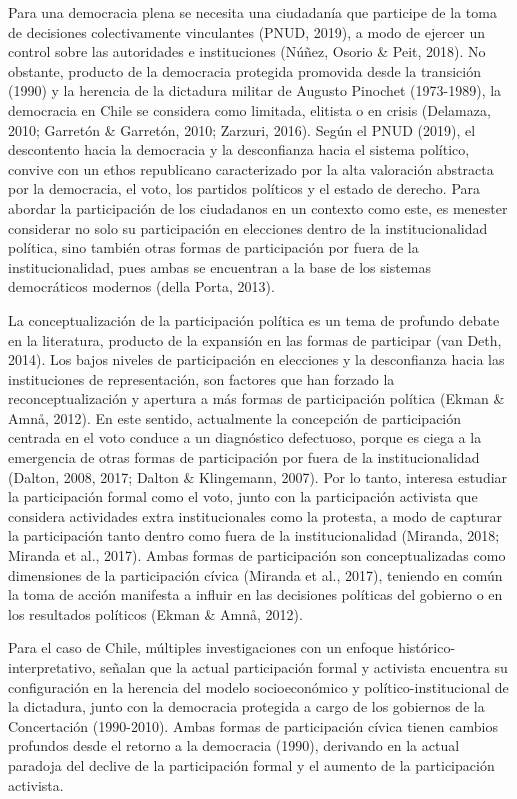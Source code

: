 \documentclass[12pt,twoside]{templates/facsothesis}
\begin{document}
Para una democracia plena se necesita una ciudadanía que participe de la toma de decisiones colectivamente vinculantes (PNUD, 2019), a modo de ejercer un control sobre las autoridades e instituciones (Núñez, Osorio \& Peit, 2018). No obstante, producto de la democracia protegida promovida desde la transición (1990) y la herencia de la dictadura militar de Augusto Pinochet (1973-1989), la democracia en Chile se considera como limitada, elitista o en crisis (Delamaza, 2010; Garretón \& Garretón, 2010; Zarzuri, 2016). Según el PNUD (2019), el descontento hacia la democracia y la desconfianza hacia el sistema político, convive con un ethos republicano caracterizado por la alta valoración abstracta por la democracia, el voto, los partidos políticos y el estado de derecho. Para abordar la participación de los ciudadanos en un contexto como este, es menester considerar no solo su participación en elecciones dentro de la institucionalidad política, sino también otras formas de participación por fuera de la institucionalidad, pues ambas se encuentran a la base de los sistemas democráticos modernos (della Porta, 2013).

La conceptualización de la participación política es un tema de profundo debate en la literatura, producto de la expansión en las formas de participar (van Deth, 2014). Los bajos niveles de participación en elecciones y la desconfianza hacia las instituciones de representación, son factores que han forzado la reconceptualización y apertura a más formas de participación política (Ekman \& Amnå, 2012). En este sentido, actualmente la concepción de participación centrada en el voto conduce a un diagnóstico defectuoso, porque es ciega a la emergencia de otras formas de participación por fuera de la institucionalidad (Dalton, 2008, 2017; Dalton \& Klingemann, 2007). Por lo tanto, interesa estudiar la participación formal como el voto, junto con la participación activista que considera actividades extra institucionales como la protesta, a modo de capturar la participación tanto dentro como fuera de la institucionalidad (Miranda, 2018; Miranda et al., 2017). Ambas formas de participación son conceptualizadas como dimensiones de la participación cívica (Miranda et al., 2017), teniendo en común la toma de acción manifesta a influir en las decisiones políticas del gobierno o en los resultados políticos (Ekman \& Amnå, 2012).

Para el caso de Chile, múltiples investigaciones con un enfoque histórico-interpretativo, señalan que la actual participación formal y activista encuentra su configuración en la herencia del modelo socioeconómico y político-institucional de la dictadura, junto con la democracia protegida a cargo de los gobiernos de la Concertación (1990-2010). Ambas formas de participación cívica tienen cambios profundos desde el retorno a la democracia (1990), derivando en la actual paradoja del declive de la participación formal y el aumento de la participación activista.
\end{document}
